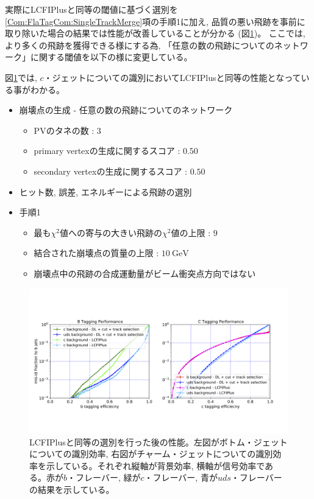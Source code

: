 実際にLCFIPlusと同等の閾値に基づく選別を\ref{Com:FlaTagCom:SingleTrackMerge}項の手順1に加え, 品質の悪い飛跡を事前に取り除いた場合の結果では性能が改善していることが分かる (図\ref{5-2-3-2FlavorTaggingROCCurve})。
ここでは, より多くの飛跡を獲得できる様にする為, 「任意の数の飛跡についてのネットワーク」に関する閾値を以下の様に変更している。

図\ref{5-2-3-2FlavorTaggingROCCurve}では, $c$・ジェットについての識別においてLCFIPlusと同等の性能となっている事がわかる。

\begin{itemize}
 \item 崩壊点の生成 - 任意の数の飛跡についてのネットワーク
 \begin{itemize}
   \item PVのタネの数 : $3$
   \item primary vertexの生成に関するスコア : $0.50$
   \item secondary vertexの生成に関するスコア : $0.50$
 \end{itemize}
 \item ヒット数, 誤差, エネルギーによる飛跡の選別
 \item 手順1
 \begin{itemize}
  \item 最も$\chi^2$値への寄与の大きい飛跡の$\chi^2$値の上限 : $9$
  \item 結合された崩壊点の質量の上限 : $10\ \mathrm{GeV}$
  \item 崩壊点中の飛跡の合成運動量がビーム衝突点方向ではない
 \end{itemize}
\end{itemize}

\begin{figure}[htbp]
 \centering
 \includegraphics[trim = 0 150 0 200, width=1.0\textwidth, clip]{Figure/5Comparison/5-2-3-2FlavorTaggingROCCurve.png}
 \caption[LCFIPlusと同等の選別を行った後の性能]{LCFIPlusと同等の選別を行った後の性能。左図がボトム・ジェットについての識別効率, 右図がチャーム・ジェットについての識別効率を示している。それぞれ縦軸が背景効率, 横軸が信号効率である。赤が$b$・フレーバー, 緑が$c$・フレーバー, 青が$uds$・フレーバーの結果を示している。}
 \label{5-2-3-2FlavorTaggingROCCurve}
\end{figure}











